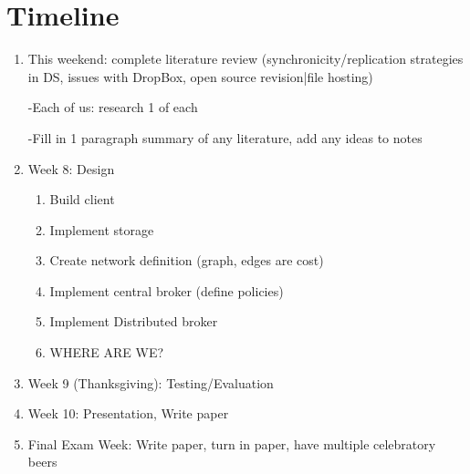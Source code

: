 \section{Timeline}
\begin{enumerate}
\item This weekend: complete literature review (synchronicity/replication strategies in DS, issues with DropBox, open source revision|file hosting)

-Each of us: research 1 of each

-Fill in 1 paragraph summary of any literature, add any ideas to notes

\item Week 8: Design
  \begin{enumerate}
    \item Build client
    \item Implement storage
    \item Create network definition (graph, edges are cost)
    \item Implement central broker (define policies)
    \item Implement Distributed broker
    \item WHERE ARE WE?
  \end{enumerate}
\item Week 9 (Thanksgiving): Testing/Evaluation
\item Week 10: Presentation, Write paper
\item Final Exam Week: Write paper, turn in paper, have multiple celebratory beers
\end{enumerate}
